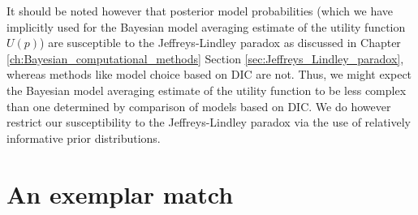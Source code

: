 It should be noted however that posterior model probabilities (which we have implicitly used for the Bayesian model
averaging estimate of the utility function \(U(p)\)) are susceptible to the Jeffreys-Lindley paradox as discussed in
Chapter \ref{ch:Bayesian_computational_methods} Section \ref{sec:Jeffreys_Lindley_paradox}, whereas methods like model
choice based on \gls{DIC} are not. Thus, we might expect the Bayesian model averaging estimate of the utility function
to be less complex than one determined by comparison of models based on \gls{DIC}. We do however restrict our
susceptibility to the Jeffreys-Lindley paradox via the use of relatively informative prior distributions.

\section{An exemplar match}
\label{sec:Manchester_City_3-2_Queens_Park_Rangers}

